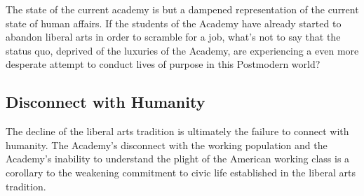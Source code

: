\documentclass[12pt,letterpaper]{article}
\begin{document}
%

%
%
%

The state of the current academy is but a dampened representation of the current state of human affairs.  If the students of the Academy have already started to abandon liberal arts in order to scramble for a job, what's not to say that the status quo, deprived of the luxuries of the Academy, are experiencing a even more desperate attempt to conduct lives of purpose in this Postmodern world?



\subsection{Disconnect with Humanity}
The decline of the liberal arts tradition is ultimately the failure to connect with humanity.  The Academy's disconnect with the working population and the Academy's inability to understand the plight of the American working class is a corollary to the weakening commitment to civic life established in the liberal arts tradition.  
\end{document}
